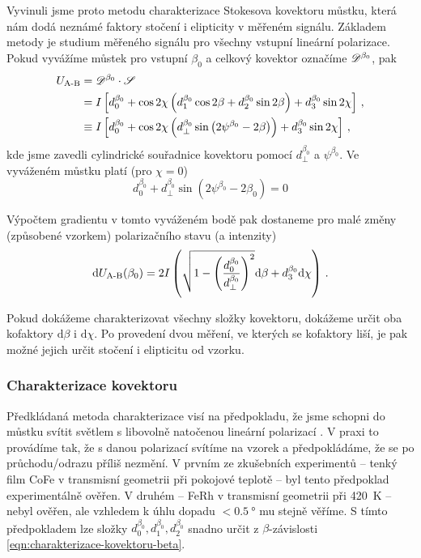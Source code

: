 Vyvinuli jsme proto metodu charakterizace Stokesova kovektoru můstku, která nám dodá neznámé faktory stočení i elipticity v měřeném signálu.
Základem metody je studium měřeného signálu pro všechny vstupní lineární polarizace.
Pokud vyvážíme můstek pro vstupní $\beta_0$ a celkový kovektor označíme $\mathscr{D}^{\beta_0}$, pak
\begin{align}
\label{eqn:charakterizace-kovektoru-beta}
    U_\textrm{A-B} &= \mathscr{D}^{\beta_0} \cdot \mathscr{S} \\ &= I \left[d^{\beta_0}_0+ \cos2\chi\left(d^{\beta_0}_1 \cos2\beta + d^{\beta_0}_2 \sin2\beta  \right) + d^{\beta_0}_3 \sin2\chi  \right] \,,\\
          &\equiv I \left[ d^{\beta_0}_0+ \cos2\chi \left(d^{\beta_0}_\perp \sin \left( 2\psi^{\beta_0} - 2\beta \right) \right) + d^{\beta_0}_3 \sin2\chi \right] \,,
\end{align}
kde jsme zavedli cylindrické souřadnice kovektoru pomocí $d^{\beta_0}_\perp$ a $\psi^{\beta_0}$.
Ve vyváženém můstku platí (pro $\chi=0$)
\begin{equation}
    d^{\beta_0}_0 + d^{\beta_0}_\perp \sin \left( 2\psi^{\beta_0} - 2\beta_0 \right) = 0
\end{equation}

Výpočtem gradientu v tomto vyváženém bodě pak dostaneme pro malé změny (způsobené vzorkem) polarizačního stavu (a intenzity)
\begin{equation}
    \textrm{d}U_\textrm{A-B}(\beta_0) = 2I \left(\sqrt{1 - \left(\frac{d^{\beta_0}_0}{d^{\beta_0}_\perp}\right)^2} \textrm{d}\beta + d^{\beta_0}_3 \textrm{d}\chi  \right) \,.
\end{equation}

Pokud dokážeme charakterizovat všechny složky kovektoru, dokážeme určit oba kofaktory $\textrm{d}\beta$ i $\textrm{d}\chi$.
Po provedení dvou měření, ve kterých se kofaktory liší, je pak možné jejich určit stočení i elipticitu od vzorku.

\subsubsection*{Charakterizace kovektoru}

Předkládaná metoda charakterizace visí na předpokladu, že jsme schopni do můstku svítit světlem s libovolně natočenou lineární polarizací \beta.
V praxi to provádíme tak, že s danou polarizací svítíme na vzorek a předpokládáme, že se po průchodu/odrazu příliš nezmění.
V prvním ze zkušebních experimentů -- tenký film CoFe v transmisní geometrii při pokojové teplotě -- byl tento předpoklad experimentálně ověřen.
V druhém -- FeRh v transmisní geometrii při \SI{420}{\kelvin} -- nebyl ověřen, ale vzhledem k úhlu dopadu $<\SI{0.5}{\degree}$ mu stejně věříme.
S tímto předpokladem lze složky $d^{\beta_0}_0, d^{\beta_0}_1, d^{\beta_0}_2$ snadno určit z $\beta$-závislosti \eqref{eqn:charakterizace-kovektoru-beta}.


